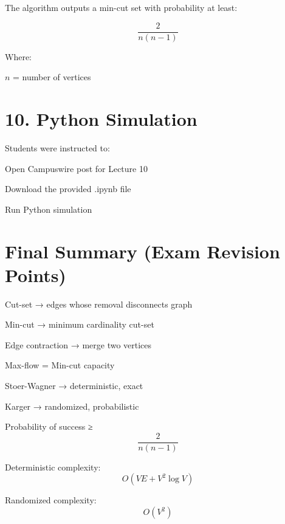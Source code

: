 \documentclass[12pt]{article}
\begin{document}
The algorithm outputs a min-cut set with probability at least:

\[
\frac{2}{n(n-1)}
\]

Where:

\( n \) = number of vertices

\section*{10. Python Simulation}

Students were instructed to:

Open Campuswire post for Lecture 10

Download the provided .ipynb file

Run Python simulation

\section*{Final Summary (Exam Revision Points)}

Cut-set → edges whose removal disconnects graph

Min-cut → minimum cardinality cut-set

Edge contraction → merge two vertices

Max-flow = Min-cut capacity

Stoer-Wagner → deterministic, exact

Karger → randomized, probabilistic

Probability of success ≥ 
\[
\frac{2}{n(n-1)}
\]

Deterministic complexity:
\[
O(VE + V^2 \log V)
\]

Randomized complexity:
\[
O(V^2)
\]
\end{document}
